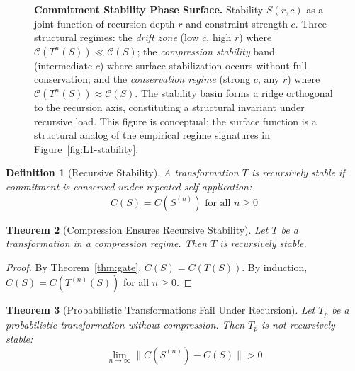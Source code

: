 \documentclass[11pt,a4paper]{article}
\newtheorem{theorem}{Theorem}[section]
\newtheorem{definition}[theorem]{Definition}
\begin{document}
\begin{figure}[htbp]
    \centering
    
    \caption{\textbf{Commitment Stability Phase Surface.}
    Stability $S(r,c)$ as a joint function of recursion depth $r$ and constraint strength $c$. Three structural regimes: the \textit{drift zone} (low $c$, high $r$) where $\mathcal{C}(T^n(S)) \ll \mathcal{C}(S)$; the \textit{compression stability} band (intermediate $c$) where surface stabilization occurs without full conservation; and the \textit{conservation regime} (strong $c$, any $r$) where $\mathcal{C}(T^n(S)) \approx \mathcal{C}(S)$. The stability basin forms a ridge orthogonal to the recursion axis, constituting a structural invariant under recursive load. This figure is conceptual; the surface function is a structural analog of the empirical regime signatures in Figure~\ref{fig:L1-stability}.}
    \label{fig:L2-phase}
\end{figure}

\begin{definition}[Recursive Stability]
A transformation $T$ is recursively stable if commitment is conserved under repeated self-application:
\begin{equation}
C(S) = C(S^{(n)}) \text{ for all } n \geq 0
\end{equation}
\end{definition}

\begin{theorem}[Compression Ensures Recursive Stability]
\label{thm:recursive-stability}
Let $T$ be a transformation in a compression regime. Then $T$ is recursively stable.
\end{theorem}

\begin{proof}
By Theorem~\ref{thm:gate}, $C(S) = C(T(S))$. By induction, $C(S) = C(T^{(n)}(S))$ for all $n \geq 0$.
\end{proof}

\begin{theorem}[Probabilistic Transformations Fail Under Recursion]
\label{thm:prob-fail}
Let $T_p$ be a probabilistic transformation without compression. Then $T_p$ is not recursively stable:
\begin{equation}
\lim_{n \to \infty} \|C(S^{(n)}) - C(S)\| > 0
\end{equation}
\end{theorem}
\end{document}
